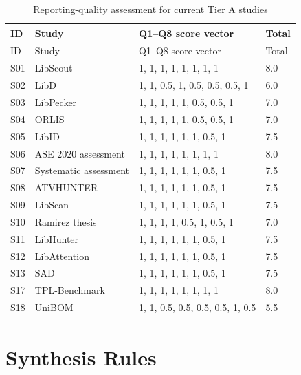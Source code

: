 \begingroup
\scriptsize
\setlength{\LTpre}{0.5em}
\setlength{\LTpost}{0.5em}
\begin{longtable}{p{}p{}p{}p{}}
  \caption{Reporting-quality assessment for current Tier A studies}
  \label{tab:review-quality-scores}\\
  \toprule
  ID & Study & Q1--Q8 score vector & Total \\
  \midrule
  \endfirsthead
  \toprule
  ID & Study & Q1--Q8 score vector & Total \\
  \midrule
  \endhead
  S01 & LibScout & 1, 1, 1, 1, 1, 1, 1, 1 & 8.0 \\
  S02 & LibD & 1, 1, 0.5, 1, 0.5, 0.5, 0.5, 1 & 6.0 \\
  S03 & LibPecker & 1, 1, 1, 1, 1, 0.5, 0.5, 1 & 7.0 \\
  S04 & ORLIS & 1, 1, 1, 1, 1, 0.5, 0.5, 1 & 7.0 \\
  S05 & LibID & 1, 1, 1, 1, 1, 1, 0.5, 1 & 7.5 \\
  S06 & ASE 2020 assessment & 1, 1, 1, 1, 1, 1, 1, 1 & 8.0 \\
  S07 & Systematic assessment & 1, 1, 1, 1, 1, 1, 0.5, 1 & 7.5 \\
  S08 & ATVHUNTER & 1, 1, 1, 1, 1, 1, 0.5, 1 & 7.5 \\
  S09 & LibScan & 1, 1, 1, 1, 1, 1, 0.5, 1 & 7.5 \\
  S10 & Ramirez thesis & 1, 1, 1, 1, 0.5, 1, 0.5, 1 & 7.0 \\
  S11 & LibHunter & 1, 1, 1, 1, 1, 1, 0.5, 1 & 7.5 \\
  S12 & LibAttention & 1, 1, 1, 1, 1, 1, 0.5, 1 & 7.5 \\
  S13 & SAD & 1, 1, 1, 1, 1, 1, 0.5, 1 & 7.5 \\
  S17 & TPL-Benchmark & 1, 1, 1, 1, 1, 1, 1, 1 & 8.0 \\
  S18 & UniBOM & 1, 1, 0.5, 0.5, 0.5, 0.5, 1, 0.5 & 5.5 \\
  \bottomrule
\end{longtable}
\endgroup

\section{Synthesis Rules}

